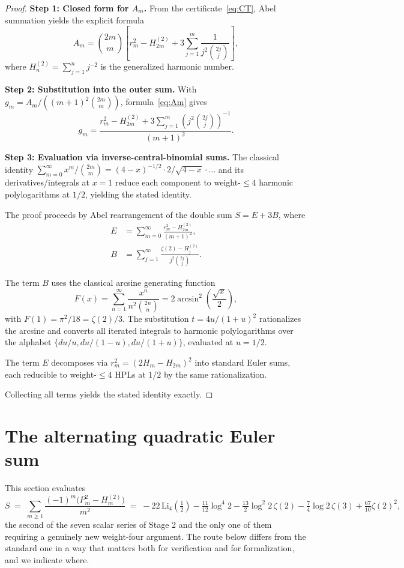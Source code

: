 \documentclass[11pt]{article}
\begin{document}
\begin{proof}
\textbf{Step 1: Closed form for $A_m$.}
From the certificate~\eqref{eq:CT}, Abel summation yields
the explicit formula
\begin{equation}\label{eq:Am}
A_m = \binom{2m}{m}\left[r_m^2 - H_{2m}^{(2)}
  + 3\sum_{j=1}^{m} \frac{1}{j^2\binom{2j}{j}}\right],
\end{equation}
where $H_n^{(2)} = \sum_{j=1}^{n} j^{-2}$ is the generalized
harmonic number.

\textbf{Step 2: Substitution into the outer sum.}
With $g_m = A_m/((m+1)^2 \binom{2m}{m})$, formula~\eqref{eq:Am}
gives
\[
g_m = \frac{r_m^2 - H_{2m}^{(2)}
  + 3\sum_{j=1}^{m} (j^2\binom{2j}{j})^{-1}}{(m+1)^2}.
\]

\textbf{Step 3: Evaluation via inverse-central-binomial sums.}
The classical identity
$\sum_{m=0}^{\infty} x^m / \binom{2m}{m} = (4-x)^{-1/2}
\cdot 2/\sqrt{4-x} \cdot \ldots$ and its derivatives/integrals
at $x = 1$ reduce each component to weight-$\le 4$ harmonic
polylogarithms at $1/2$, yielding the stated identity.

The proof proceeds by Abel rearrangement of the double sum
$S = E + 3B$, where
\begin{align*}
E &= \sum_{m=0}^{\infty} \frac{r_m^2 - H_{2m}^{(2)}}{(m+1)^2}, \\
B &= \sum_{j=1}^{\infty} \frac{\zeta(2) - H_j^{(2)}}{j^2 \binom{2j}{j}}.
\end{align*}

The term $B$ uses the classical arcsine generating function
\[
F(x) = \sum_{n=1}^{\infty} \frac{x^n}{n^2\binom{2n}{n}}
= 2\arcsin^2\!\left(\frac{\sqrt{x}}{2}\right),
\]
with $F(1) = \pi^2/18 = \zeta(2)/3$.  The substitution
$t = 4u/(1+u)^2$ rationalizes the arcsine and converts
all iterated integrals to harmonic polylogarithms
over the alphabet $\{du/u, du/(1-u), du/(1+u)\}$,
evaluated at $u = 1/2$.

The term $E$ decomposes via $r_m^2 = (2H_m - H_{2m})^2$
into standard Euler sums, each reducible to weight-$\le 4$
HPLs at $1/2$ by the same rationalization.

Collecting all terms yields the stated identity exactly.
\end{proof}

\section{The alternating quadratic Euler sum}\label{sec:alt}

This section evaluates
\begin{equation}\label{eq:S}
S \;=\; \sum_{m\ge 1} \frac{(-1)^{m}\bigl(P_m^{2} - H_m^{(2)}\bigr)}{m^{2}}
\;=\; -22\,\mathrm{Li}_4(\tfrac12) - \tfrac{11}{12}\log^4 2
      - \tfrac{13}{2}\log^2\!2\,\zeta(2) - \tfrac{7}{4}\log 2\,\zeta(3)
      + \tfrac{67}{10}\zeta(2)^2,
\end{equation}
the second of the seven scalar series of Stage 2 and the only one of them
requiring a genuinely new weight-four argument.  The route below differs
from the standard one in a way that matters both for verification and for
formalization, and we indicate where.
\end{document}

